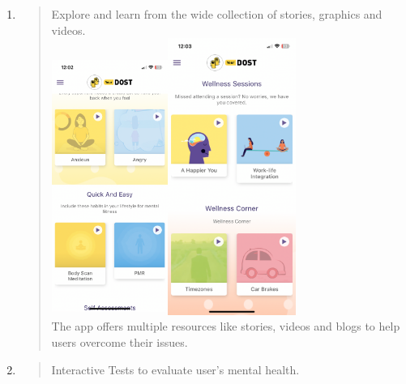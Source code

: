 \documentclass[manuscript,screen,review]{acmart}
\begin{document}
\begin{enumerate}
\def\labelenumi{\arabic{enumi}.}
\setcounter{enumi}{2}
\item
  \begin{quote}
  Explore and learn from the wide collection of stories, graphics and
  videos.\\
  \includegraphics[width=1.49474in,height=3.31321in]{vertopal.com_Untitleddocument/vertopal_25c0ff455f73469eb1b6e3e4452807f6/media/image7.png}\includegraphics[width=1.65104in,height=3.55846in]{vertopal.com_Untitleddocument/vertopal_25c0ff455f73469eb1b6e3e4452807f6/media/image8.png}\\
  The app offers multiple resources like stories, videos and blogs to
  help users overcome their issues.
  \end{quote}
\item
  \begin{quote}
  Interactive Tests to evaluate user's mental health.\\

\end{quote}
\end{enumerate}
\end{document}
